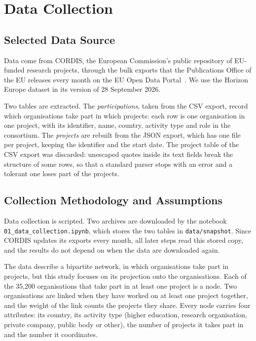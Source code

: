 \documentclass[sigchi]{acmart}
\begin{document}
\section{Data Collection}
\label{sec:data}

\subsection{Selected Data Source}

Data come from CORDIS, the European Commission's public repository of EU-funded research projects, through the bulk exports that the Publications Office of the EU releases every month on the EU Open Data Portal~\cite{cordis}. We use the Horizon Europe dataset in its version of 28 September 2026.

Two tables are extracted. The \emph{participations}, taken from the CSV export, record which organisations take part in which projects: each row is one organisation in one project, with its identifier, name, country, activity type and role in the consortium.  The \emph{projects} are rebuilt from the JSON export, which has one file per project, keeping the identifier and the start date. The project table of the CSV export was discarded: unescaped quotes inside its text fields break the structure of some rows, so that a standard parser stops with an error and a tolerant one loses part of the projects.

\subsection{Collection Methodology and Assumptions}

{\sloppy Data collection is scripted. Two archives are downloaded by the notebook \texttt{01\_\allowbreak data\_\allowbreak collection.ipynb}, which stores the two tables in \texttt{data/\allowbreak snapshot}. Since CORDIS updates its exports every month, all later steps read this stored copy, and the results do not depend on when the data are downloaded again.\par}

The data describe a bipartite network, in which organisations take part in projects, but this study focuses on its projection onto the organisations. Each of the 35,200 organisations that take part in at least one project is a node. Two organisations are linked when they have worked on at least one project together, and the weight of the link counts the projects they share. Every node carries four attributes: its country, its activity type (higher education, research organisation, private company, public body or other), the number of projects it takes part in and the number it coordinates.
\end{document}
